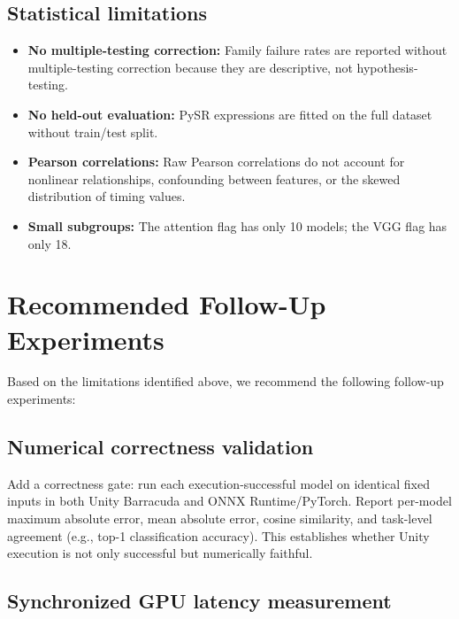 \documentclass[10pt,twocolumn,letterpaper]{article}
\begin{document}
\subsection{Statistical limitations}

\begin{itemize}[nosep,leftmargin=*]
  \item \textbf{No multiple-testing correction:} Family failure rates are reported without multiple-testing correction because they are descriptive, not hypothesis-testing.
  \item \textbf{No held-out evaluation:} PySR expressions are fitted on the full dataset without train/test split.
  \item \textbf{Pearson correlations:} Raw Pearson correlations do not account for nonlinear relationships, confounding between features, or the skewed distribution of timing values.
  \item \textbf{Small subgroups:} The attention flag has only 10 models; the VGG flag has only 18.
\end{itemize}

\section{Recommended Follow-Up Experiments}\label{sec:followup}

Based on the limitations identified above, we recommend the following follow-up experiments:

\subsection{Numerical correctness validation}

Add a correctness gate: run each execution-successful model on identical fixed inputs in both Unity Barracuda and ONNX Runtime/PyTorch. Report per-model maximum absolute error, mean absolute error, cosine similarity, and task-level agreement (e.g., top-1 classification accuracy). This establishes whether Unity execution is not only successful but numerically faithful.

\subsection{Synchronized GPU latency measurement}
\end{document}
